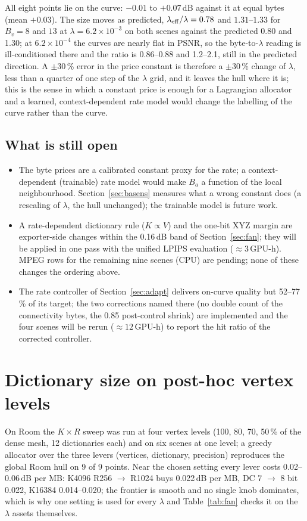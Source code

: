 \documentclass[11pt,a4paper]{article}
\begin{document}
All eight points lie on the curve: $-0.01$ to $+0.07$\,dB against it at equal bytes (mean $+0.03$). The size moves as predicted, $\lambda_{\rm eff}/\lambda = 0.78$ and $1.31$--$1.33$ for $B_v = 8$ and $13$ at $\lambda = 6.2\times10^{-3}$ on both scenes against the predicted 0.80 and 1.30; at $6.2\times10^{-4}$ the curves are nearly flat in PSNR, so the byte-to-$\lambda$ reading is ill-conditioned there and the ratio is 0.86--0.88 and 1.2--2.1, still in the predicted direction. A $\pm 30$\,\% error in the price constant is therefore a $\pm 30$\,\% change of $\lambda$, less than a quarter of one step of the $\lambda$ grid, and it leaves the hull where it is; this is the sense in which a constant price is enough for a Lagrangian allocator and a learned, context-dependent rate model would change the labelling of the curve rather than the curve.

\subsection{What is still open}
\begin{itemize}[nosep,leftmargin=*]
  \item The byte prices are a calibrated constant proxy for the rate; a context-dependent (trainable) rate model would make $B_a$ a function of the local neighbourhood. Section~\ref{sec:basens} measures what a wrong constant does (a rescaling of $\lambda$, the hull unchanged); the trainable model is future work.
  \item A rate-dependent dictionary rule ($K \propto V$) and the one-bit XYZ margin are exporter-side changes within the 0.16\,dB band of Section~\ref{sec:fan}; they will be applied in one pass with the unified LPIPS evaluation ($\approx 3$\,GPU-h). MPEG rows for the remaining nine scenes (CPU) are pending; none of these changes the ordering above.
  \item The rate controller of Section~\ref{sec:adapt} delivers on-curve quality but 52--77\,\% of its target; the two corrections named there (no double count of the connectivity bytes, the 0.85 post-control shrink) are implemented and the four scenes will be rerun ($\approx 12$\,GPU-h) to report the hit ratio of the corrected controller.
\end{itemize}

\appendix
\section{Dictionary size on post-hoc vertex levels}
\label{app:levels}
On Room the $K \times R$ sweep was run at four vertex levels (100, 80, 70, 50\,\% of the dense mesh, 12 dictionaries each) and on six scenes at one level; a greedy allocator over the three levers (vertices, dictionary, precision) reproduces the global Room hull on 9 of 9 points. Near the chosen setting every lever costs 0.02--0.06\,dB per MB: K4096 R256 $\to$ R1024 buys 0.022\,dB per MB, DC 7 $\to$ 8 bit 0.022, K16384 0.014--0.020; the frontier is smooth and no single knob dominates, which is why one setting is used for every $\lambda$ and Table~\ref{tab:fan} checks it on the $\lambda$ assets themselves.
\end{document}

